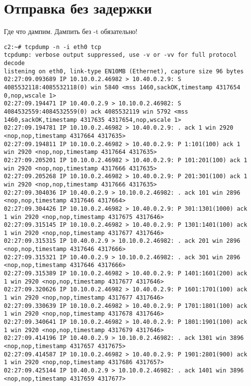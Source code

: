 \documentclass[a4paper,12pt]{article}
\begin{document}
\section{Отправка без задержки}

Где что дампим.  Дампить без -t обязательно!

\begin{Verbatim}
c2:~# tcpdump -n -i eth0 tcp
tcpdump: verbose output suppressed, use -v or -vv for full protocol decode
listening on eth0, link-type EN10MB (Ethernet), capture size 96 bytes
02:27:09.093689 IP 10.10.0.2.46982 > 10.40.0.2.9: S 4085532118:4085532118(0) win 5840 <mss 1460,sackOK,timestamp 4317654 0,nop,wscale 1>
02:27:09.194471 IP 10.40.0.2.9 > 10.10.0.2.46982: S 4084532559:4084532559(0) ack 4085532119 win 5792 <mss 1460,sackOK,timestamp 4317635 4317654,nop,wscale 1>
02:27:09.194781 IP 10.10.0.2.46982 > 10.40.0.2.9: . ack 1 win 2920 <nop,nop,timestamp 4317664 4317635>
02:27:09.194811 IP 10.10.0.2.46982 > 10.40.0.2.9: P 1:101(100) ack 1 win 2920 <nop,nop,timestamp 4317664 4317635>
02:27:09.205201 IP 10.10.0.2.46982 > 10.40.0.2.9: P 101:201(100) ack 1 win 2920 <nop,nop,timestamp 4317666 4317635>
02:27:09.205268 IP 10.10.0.2.46982 > 10.40.0.2.9: P 201:301(100) ack 1 win 2920 <nop,nop,timestamp 4317666 4317635>
02:27:09.304036 IP 10.40.0.2.9 > 10.10.0.2.46982: . ack 101 win 2896 <nop,nop,timestamp 4317646 4317664>
02:27:09.304426 IP 10.10.0.2.46982 > 10.40.0.2.9: P 301:1301(1000) ack 1 win 2920 <nop,nop,timestamp 4317675 4317646>
02:27:09.315145 IP 10.10.0.2.46982 > 10.40.0.2.9: P 1301:1401(100) ack 1 win 2920 <nop,nop,timestamp 4317677 4317646>
02:27:09.315315 IP 10.40.0.2.9 > 10.10.0.2.46982: . ack 201 win 2896 <nop,nop,timestamp 4317646 4317666>
02:27:09.315321 IP 10.40.0.2.9 > 10.10.0.2.46982: . ack 301 win 2896 <nop,nop,timestamp 4317646 4317666>
02:27:09.315389 IP 10.10.0.2.46982 > 10.40.0.2.9: P 1401:1601(200) ack 1 win 2920 <nop,nop,timestamp 4317677 4317646>
02:27:09.320626 IP 10.10.0.2.46982 > 10.40.0.2.9: P 1601:1701(100) ack 1 win 2920 <nop,nop,timestamp 4317677 4317646>
02:27:09.330639 IP 10.10.0.2.46982 > 10.40.0.2.9: P 1701:1801(100) ack 1 win 2920 <nop,nop,timestamp 4317678 4317646>
02:27:09.340641 IP 10.10.0.2.46982 > 10.40.0.2.9: P 1801:1901(100) ack 1 win 2920 <nop,nop,timestamp 4317679 4317646>
02:27:09.414196 IP 10.40.0.2.9 > 10.10.0.2.46982: . ack 1301 win 3896 <nop,nop,timestamp 4317657 4317675>
02:27:09.414587 IP 10.10.0.2.46982 > 10.40.0.2.9: P 1901:2801(900) ack 1 win 2920 <nop,nop,timestamp 4317686 4317657>
02:27:09.425144 IP 10.40.0.2.9 > 10.10.0.2.46982: . ack 1401 win 3896 <nop,nop,timestamp 4317659 4317677>

\end{Verbatim}
\end{document}
